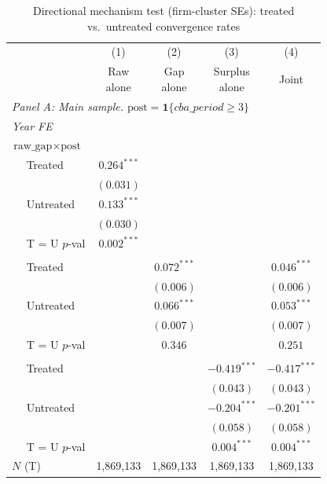 \begin{table}[H]
\centering
\caption{Directional mechanism test (firm-cluster SEs): treated vs.\ untreated convergence rates}
\label{tab:mechanism_test_directional_firmcluster}
\scriptsize
\begin{tabular}{lcccc}
\toprule\toprule
 & (1) & (2) & (3) & (4) \\
 & \shortstack{Raw \\ alone} & \shortstack{Gap \\ alone} & \shortstack{Surplus \\ alone} & Joint \\
\midrule
\multicolumn{5}{l}{\textit{Panel A: Main sample. $\text{post} = \mathbf{1}\{cba\_period \geq 3\}$}} \\
\midrule
\multicolumn{5}{l}{\textit{Year FE}} \\
\multicolumn{5}{l}{$\text{raw\_gap} \times \text{post}$} \\
$\quad$ Treated & $0.264^{***}$ &  &  &  \\
 & $(0.031)$ &  &  &  \\
$\quad$ Untreated & $0.133^{***}$ &  &  &  \\
 & $(0.030)$ &  &  &  \\
$\quad$ T = U $p$-val & $0.002^{***}$ &  &  &  \\
\addlinespace[2pt]
\multicolumn{5}{l}{$\text{gap} \times \text{post}$} \\
$\quad$ Treated &  & $0.072^{***}$ &  & $0.046^{***}$ \\
 &  & $(0.006)$ &  & $(0.006)$ \\
$\quad$ Untreated &  & $0.066^{***}$ &  & $0.053^{***}$ \\
 &  & $(0.007)$ &  & $(0.007)$ \\
$\quad$ T = U $p$-val &  & $0.346$ &  & $0.251$ \\
\addlinespace[2pt]
\multicolumn{5}{l}{$\text{surplus} \times \text{post}$} \\
$\quad$ Treated &  &  & $-0.419^{***}$ & $-0.417^{***}$ \\
 &  &  & $(0.043)$ & $(0.043)$ \\
$\quad$ Untreated &  &  & $-0.204^{***}$ & $-0.201^{***}$ \\
 &  &  & $(0.058)$ & $(0.058)$ \\
$\quad$ T = U $p$-val &  &  & $0.004^{***}$ & $0.004^{***}$ \\
\addlinespace[2pt]
$N$ (T) & 1,869,133 & 1,869,133 & 1,869,133 & 1,869,133 \\

\end{tabular}
\end{table}
